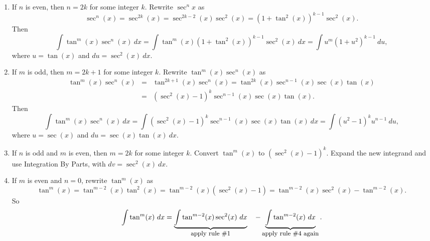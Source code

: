 \begin{enumerate}
\item		If $n$ is even, then $n=2k$ for some integer $k$. Rewrite $\sec^nx$ as 
$$\sec^n(x) = \sec^{2k}(x) = \sec^{2k-2}(x)\sec^2(x) = (1+\tan^2(x))^{k-1}\sec^2(x).$$
Then
$$\int\tan^m(x)\sec^n(x)\ dx=\int\tan^m(x)(1+\tan^2(x))^{k-1}\sec^2(x)\ dx = \int u^m(1+u^2)^{k-1}\ du,$$
where $u = \tan (x)$ and $du = \sec^2(x)\ dx$.

\item		If $m$ is odd, then $m=2k+1$ for some integer $k$. Rewrite $\tan^m(x)\sec^n(x)$ as
\begin{eqnarray*}
\tan^m(x)\sec^n(x) &=& \tan^{2k+1}(x)\sec^n(x) = \tan^{2k}(x)\sec^{n-1}(x)\sec (x)\tan (x)\\[0.2cm]
&=& (\sec^2(x)-1)^k\sec^{n-1}(x)\sec (x)\tan (x).
\end{eqnarray*}
Then
$$\int\tan^m(x)\sec^n(x)\ dx=\int(\sec^2(x)-1)^k\sec^{n-1}(x)\sec (x)\tan (x)\ dx = \int(u^2-1)^ku^{n-1}\ du,$$
where $u = \sec (x)$ and $du = \sec (x)\tan (x)\ dx$.

\item If $n$ is odd and $m$ is even, then $m=2k$ for some integer $k$. Convert $\tan^m(x) $ to $(\sec^2(x)-1)^k$. Expand the new integrand and use Integration By Parts, with $dv = \sec^2(x)\ dx$.

\item		If $m$ is even and $n=0$, rewrite $\tan^m(x)$ as
$$\tan^m(x) = \tan^{m-2}(x)\tan^2(x) = \tan^{m-2}(x)(\sec^2(x)-1) = \tan^{m-2}(x)\sec^2(x)-\tan^{m-2}(x).$$
So
$$\int\tan^m(x)\ dx = \underbrace{\int\tan^{m-2}(x)\sec^2(x)\ dx}_{\text{\small apply rule \#1}}\quad - \underbrace{\int\tan^{m-2}(x)\ dx}_{\text{\small apply rule \#4 again}}.$$

\end{enumerate}

